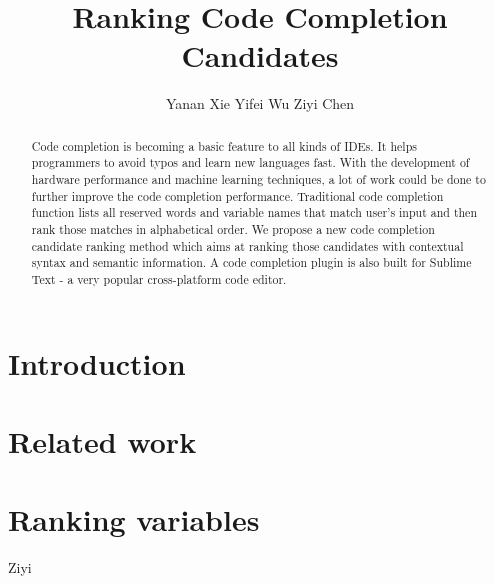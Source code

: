 \documentclass[prodmode,acmtecs]{acmsmall} %
\begin{document}

\title{Ranking Code Completion Candidates}
\author{Yanan Xie
Yifei Wu
Ziyi Chen
}

\begin{abstract}
Code completion is becoming a basic feature to all kinds of IDEs. It helps programmers to avoid typos and learn new languages fast. With the development of hardware performance and machine learning techniques, a lot of work could be done to further improve the code completion performance. Traditional code completion function lists all reserved words and variable names that match user’s input and then rank those matches in alphabetical order. We propose a new code completion candidate ranking method which aims at ranking those candidates with contextual syntax and semantic information. A code completion plugin is also built for Sublime Text - a very popular cross-platform code editor.
\end{abstract}


\maketitle


\section{Introduction}
\section{Related work}
\section{Ranking variables}
Ziyi
\end{document}
